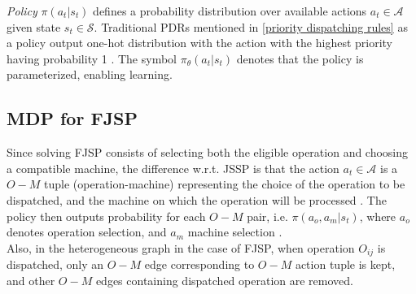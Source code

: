 \textit{Policy} $\pi(a_t|s_t)$ defines a probability distribution over available actions $a_t \in \mathcal{A}$ given state $s_t \in \mathcal{S}$. Traditional PDRs mentioned in \ref{priority dispatching rules} as a policy output one-hot distribution with the action with the highest priority having probability 1 \cite{zhang2020learning}. The symbol $\pi_\theta(a_t|s_t)$ denotes that the policy is parameterized, enabling learning.

\subsection{MDP for FJSP} 
Since solving FJSP consists of selecting both the eligible operation and choosing a compatible machine, the difference w.r.t. JSSP is that the action $a_t \in \mathcal{A}$ is a $O-M$ tuple (operation-machine) representing the choice of the operation to be dispatched, and the machine on which the operation will be processed \cite{9826438, LEI2022117796}. The policy then outputs probability for each $O-M$ pair, i.e. $\pi(a_o, a_m | s_t)$, where $a_o$ denotes operation selection, and $a_m$ machine selection \cite{LEI2022117796}.\\
Also, in the heterogeneous graph in the case of FJSP, when operation $O_{ij}$ is dispatched, only an $O-M$ edge corresponding to $O-M$ action tuple is kept, and other $O-M$ edges containing dispatched operation are removed.  


